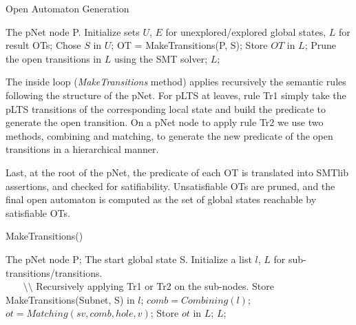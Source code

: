 \documentclass{lncs/llncs}
\begin{document}
\begin{algorithm}[h]
\caption{Open Automaton Generation}
\begin{algorithmic}[1]
\Require The pNet node P.
\State Initialize sets $U$, $E$ for unexplored/explored global states, $L$ for result OTs;
	\State Chose $S$ in $U$;
	\State OT = MakeTransitions(P, S);
        \State Store $OT$ in $L$; 
	\EndFor
\EndWhile
\State Prune the open transitions in $L$ using the SMT solver;
\State \Return $L$;

\end{algorithmic}  
\end{algorithm}

The inside loop (\emph{MakeTransitions} method) applies recursively
the semantic rules following the structure of the pNet. 
For pLTS at leaves, rule Tr1 simply take the pLTS transitions of the
corresponding local state and build the predicate to generate the
open transition. 
On a pNet node to apply rule Tr2 we use two methods, combining and
matching, to generate the new predicate of the open transitions in a
hierarchical manner.

Last, at the root of the pNet, the predicate of each OT is translated
into SMTlib assertions, and checked for satifiability. Unsatisfiable
OTs are pruned, and the final open automaton is computed as the set of
global states reachable by satisfiable OTs. 



\begin{algorithm}
\caption{MakeTransitions()}
\begin{algorithmic}[1]
\Require The pNet node P; The start global state S.
\State Initialize a list $l$, $L$ for sub-transitions/transitions.
	\\ ~~~ $\setminus \setminus$ Recursively applying Tr1 or Tr2 on the sub-nodes.
                \State Store MakeTransitions(Subnet, S) in $l$;
	\EndFor
		\State $comb = Combining(l)$;
                 \State $ot = Matching(sv, comb, hole, v)$;
                 \State Store $ot$ in $L$; 
	\EndFor
\State \Return $L$;
\end{algorithmic}  
\end{algorithm}



%
%
\end{document}
